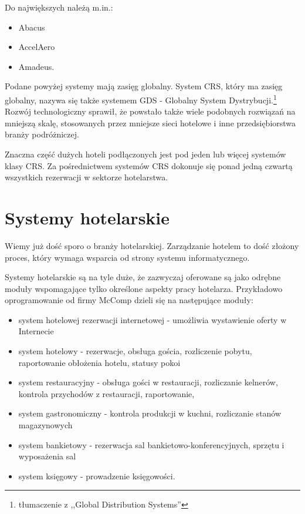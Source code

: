 \documentclass[a4paper,onecolumn,oneside,11pt,wide,floatssmall]{mwrep}
\theoremstyle{definition}
\theoremstyle{plain}%
\theoremstyle{remark}
\begin{document}
Do największych należą m.in.:
\begin{itemize}
\item Abacus
\item AccelAero
\item Amadeus.
\end{itemize}

Podane powyżej systemy mają zasięg globalny. System CRS, który ma zasięg 
globalny, nazywa się także systemem GDS - Globalny System Dystrybucji.\footnote
{tłumaczenie z ,,Global Distribution Systems''} Rozwój technologiczny 
sprawił, że powstało także wiele podobnych rozwiązań na mniejszą skalę, 
stosowanych przez mniejsze sieci hotelowe i inne przedsiębiorstwa branży 
podróżniczej. 

Znaczna część dużych hoteli podłączonych jest pod jeden lub więcej systemów 
klasy CRS. Za pośrednictwem systemów CRS dokonuje się ponad jedną czwartą wszystkich 
rezerwacji w sektorze hotelarstwa.

\section{Systemy hotelarskie}
Wiemy już dość sporo o branży hotelarskiej. Zarządzanie hotelem to dość złożony proces, który wymaga wsparcia od strony systemu informatycznego.

Systemy hotelarskie są na tyle duże, że zazwyczaj oferowane są jako odrębne moduły wspomagające tylko określone aspekty pracy hotelarza. Przykładowo oprogramowanie od firmy McComp dzieli się na następujące moduły:

\begin{itemize}
  \item system hotelowej rezerwacji internetowej - umożliwia wystawienie oferty w Internecie
  \item system hotelowy - rezerwacje, obsługa gościa, rozliczenie pobytu, raportowanie obłożenia hotelu, statusy pokoi
  \item system restauracyjny - obsługa gości w restauracji, rozliczanie kelnerów, kontrola przychodów z restauracji, raportowanie,
  \item system gastronomiczny - kontrola produkcji w kuchni, rozliczanie stanów magazynowych
  \item system bankietowy - rezerwacja sal bankietowo-konferencyjnych, sprzętu i wyposażenia sal
  \item system księgowy - prowadzenie księgowości.
\end{itemize}
\end{document}
